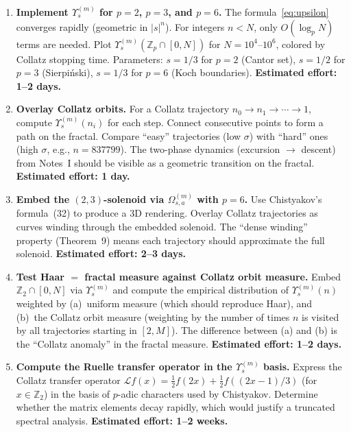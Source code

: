 \documentclass[11pt,a4paper]{article}
\newcommand{\Z}{\mathbb{Z}}
\theoremstyle{plain}
\theoremstyle{definition}
\begin{document}
\begin{enumerate}
    \item \textbf{Implement $\Upsilon_s^{(m)}$ for $p = 2$, $p = 3$, and $p = 6$.} The formula~\eqref{eq:upsilon} converges rapidly (geometric in $|s|^n$). For integers $n < N$, only $O(\log_p N)$ terms are needed. Plot $\Upsilon_s^{(m)}(\Z_p \cap [0, N])$ for $N = 10^4$--$10^6$, colored by Collatz stopping time. Parameters: $s = 1/3$ for $p = 2$ (Cantor set), $s = 1/2$ for $p = 3$ (Sierpi\'nski), $s = 1/3$ for $p = 6$ (Koch boundaries). \textbf{Estimated effort: 1--2 days.}

    \item \textbf{Overlay Collatz orbits.} For a Collatz trajectory $n_0 \to n_1 \to \cdots \to 1$, compute $\Upsilon_s^{(m)}(n_i)$ for each step. Connect consecutive points to form a path on the fractal. Compare ``easy'' trajectories (low $\sigma$) with ``hard'' ones (high $\sigma$, e.g., $n = 837799$). The two-phase dynamics (excursion $\to$ descent) from Notes~I should be visible as a geometric transition on the fractal. \textbf{Estimated effort: 1 day.}

    \item \textbf{Embed the $(2,3)$-solenoid via $\Omega_{s,a}^{(m)}$ with $p = 6$.} Use Chistyakov's formula~(32) to produce a 3D rendering. Overlay Collatz trajectories as curves winding through the embedded solenoid. The ``dense winding'' property (Theorem~9) means each trajectory should approximate the full solenoid. \textbf{Estimated effort: 2--3 days.}

    \item \textbf{Test Haar $=$ fractal measure against Collatz orbit measure.} Embed $\Z_2 \cap [0, N]$ via $\Upsilon_s^{(m)}$ and compute the empirical distribution of $\Upsilon_s^{(m)}(n)$ weighted by (a)~uniform measure (which should reproduce Haar), and (b)~the Collatz orbit measure (weighting by the number of times $n$ is visited by all trajectories starting in $[2, M]$). The difference between (a) and (b) is the ``Collatz anomaly'' in the fractal measure. \textbf{Estimated effort: 1--2 days.}

    \item \textbf{Compute the Ruelle transfer operator in the $\Upsilon_s^{(m)}$ basis.} Express the Collatz transfer operator $\mathcal{L}f(x) = \frac{1}{2}f(2x) + \frac{1}{2}f((2x-1)/3)$ (for $x \in \Z_2$) in the basis of $p$-adic characters used by Chistyakov. Determine whether the matrix elements decay rapidly, which would justify a truncated spectral analysis. \textbf{Estimated effort: 1--2 weeks.}
\end{enumerate}
\end{document}
